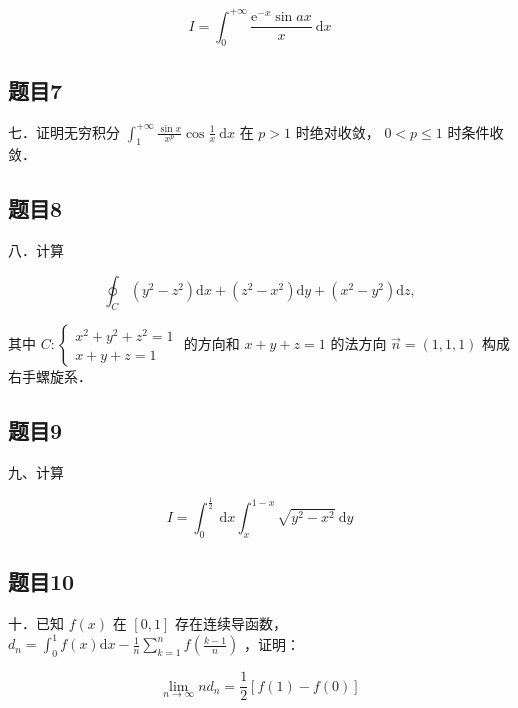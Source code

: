 \documentclass{article}
\begin{document}
\[
I=\int_{0}^{+\infty} \frac{\mathrm{e}^{-x} \sin a x}{x} \mathrm{~d} x
\]

\subsection{题目7}
七．证明无穷积分 \(\int_{1}^{+\infty} \frac{\sin x}{x^{p}} \cos \frac{1}{x} \mathrm{~d} x\) 在 \(p>1\) 时绝对收敛， \(0<p \leq 1\) 时条件收敛．

\subsection{题目8}
八．计算

\[
\oint_{C}\left(y^{2}-z^{2}\right) \mathrm{d} x+\left(z^{2}-x^{2}\right) \mathrm{d} y+\left(x^{2}-y^{2}\right) \mathrm{d} z,
\]

其中 \(C:\left\{\begin{array}{l}x^{2}+y^{2}+z^{2}=1 \\ x+y+z=1\end{array}\right.\) 的方向和 \(x+y+z=1\) 的法方向 \(\vec{n}=(1,1,1)\) 构成右手螺旋系．

\subsection{题目9}
九、计算

\[
I=\int_{0}^{\frac{1}{2}} \mathrm{~d} x \int_{x}^{1-x} \sqrt{y^{2}-x^{2}} \mathrm{~d} y
\]

\subsection{题目10}
十．已知 \(f(x)\) 在 \([0,1]\) 存在连续导函数，\(d_{n}=\int_{0}^{1} f(x) \mathrm{d} x-\frac{1}{n} \sum_{k=1}^{n} f\left(\frac{k-1}{n}\right)\) ，证明：

\[
\lim _{n \rightarrow \infty} n d_{n}=\frac{1}{2}[f(1)-f(0)]
\]
\end{document}
